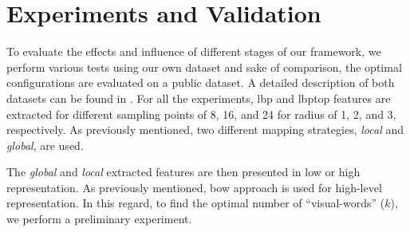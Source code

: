 
\section{Experiments and Validation}\label{sec:exp}


To evaluate the effects and influence of different stages of our framework, we perform various tests using our own dataset and sake of comparison, the optimal configurations are evaluated on a public dataset. A detailed description of both datasets can be found in .
For all the experiments, \ac{lbp} and \ac{lbptop} features are extracted for different sampling points of 8, 16, and 24 for radius of 1, 2, and 3, respectively.
As previously mentioned, two different mapping strategies, \emph{local} and \emph{global}, are used.

%

The \emph{global} and \emph{local} extracted features are then presented in low or high representation.
As previously mentioned, \ac{bow} approach is used for high-level representation.
In this regard, to find the optimal number of ``visual-words'' ($k$), we perform a preliminary experiment. 

